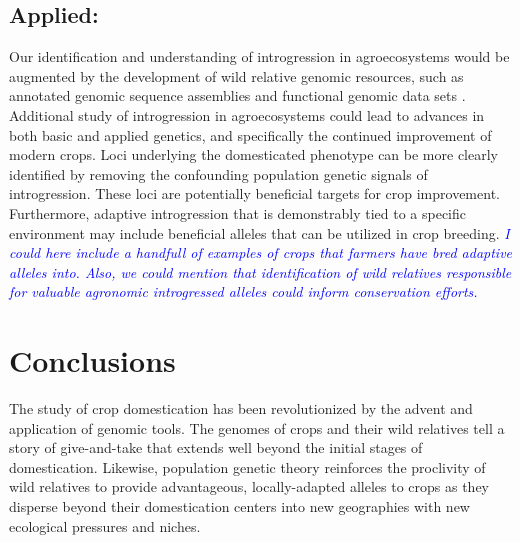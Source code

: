 \documentclass[11pt]{article}
\newcommand{\gmj}[1]{\textcolor{blue}{ \emph{\scriptsize  #1}} } %
\begin{document}
\subsection*{Applied:}
Our identification and understanding of introgression in agroecosystems would be augmented by the development of wild relative genomic resources, such as annotated genomic sequence assemblies and functional genomic data sets \cite{huang2012}.
Additional study of introgression in agroecosystems could lead to advances in both basic and applied genetics, and specifically the continued improvement of modern crops.
Loci underlying the domesticated phenotype can be more clearly identified by removing the confounding population genetic signals of introgression.
These loci are potentially beneficial targets for crop improvement.
Furthermore, adaptive introgression that is demonstrably tied to a specific environment may include beneficial alleles that can be utilized in crop breeding.
\gmj{I could here include a handfull of examples of crops that farmers have bred adaptive alleles into.  Also, we could mention that identification of wild relatives responsible for valuable agronomic introgressed alleles could inform conservation efforts.}














\section*{Conclusions}

The study of crop domestication has been revolutionized by the advent and application of genomic tools.
The genomes of crops and their wild relatives tell a story of give-and-take that extends well beyond the initial stages of domestication.
Likewise, population genetic theory reinforces the proclivity of wild relatives to provide advantageous, locally-adapted alleles to crops as they disperse beyond their domestication centers into new geographies with new ecological pressures and niches.














\end{document}
